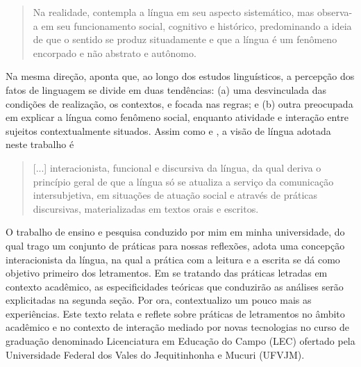 \documentclass{textolivre}
\begin{document}
\begin{quote}
  Na realidade, contempla a língua em seu aspecto sistemático, mas observa-a em seu funcionamento social, cognitivo e histórico, predominando a ideia de que o sentido se produz situadamente e que a língua é um fenômeno encorpado e não abstrato e autônomo.
\end{quote}

Na mesma direção, \textcite{antunes_aula_2003} aponta que, ao longo dos estudos linguísticos, a percepção dos fatos de linguagem se divide em duas tendências: (a) uma desvinculada das condições de realização, os contextos, e focada nas regras; e (b) outra preocupada em explicar a língua como fenômeno social, enquanto atividade e interação entre sujeitos contextualmente situados. Assim como \textcite{antunes_aula_2003} e \textcite{marcuschi_producao_2008}, a visão de língua adotada neste trabalho é 

\begin{quote}
[...] interacionista, funcional e discursiva da língua, da qual deriva o princípio geral de que a língua só se atualiza a serviço da comunicação intersubjetiva, em situações de atuação social e através de práticas discursivas, materializadas em textos orais e escritos. \cite[p. 42]{antunes_aula_2003}  
\end{quote}

O trabalho de ensino e pesquisa conduzido por mim em minha universidade, do qual trago um conjunto de práticas para nossas reflexões, adota uma concepção interacionista da língua, na qual a prática com a leitura e a escrita se dá como objetivo primeiro dos letramentos. Em se tratando das práticas letradas em contexto acadêmico, as especificidades teóricas que conduzirão as análises serão explicitadas na segunda seção. Por ora, contextualizo um pouco mais as experiências. Este texto relata e reflete sobre práticas de letramentos no âmbito acadêmico e no contexto de interação mediado por novas tecnologias no curso de graduação denominado Licenciatura em Educação do Campo (LEC) ofertado pela Universidade Federal dos Vales do Jequitinhonha e Mucuri (UFVJM).
\end{document}
